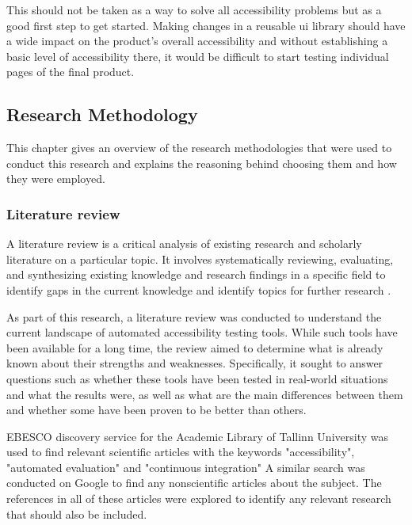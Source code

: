 \documentclass{master_thesis}
\begin{document}
This should not be taken as a way to solve all accessibility problems but as a good first step to get started. Making changes in a reusable \ac{ui} library should have a wide impact on the product's overall accessibility and without establishing a basic level of accessibility there, it would be difficult to start testing individual pages of the final product.

\subsection{Research Methodology}


This chapter gives an overview of the research methodologies that were used to conduct this research and explains the reasoning behind choosing them and how they were employed.

\subsubsection{Literature review}

A literature review is a critical analysis of existing research and scholarly literature on a particular topic. It involves systematically reviewing, evaluating, and synthesizing existing knowledge and research findings in a specific field to identify gaps in the current knowledge and identify topics for further research \citep{Luft2022}.

As part of this research, a literature review was conducted to understand the current landscape of automated accessibility testing tools. While such tools have been available for a long time, the review aimed to determine what is already known about their strengths and weaknesses. Specifically, it sought to answer questions such as whether these tools have been tested in real-world situations and what the results were, as well as what are the main differences between them and whether some have been proven to be better than others.

EBESCO discovery service for the Academic Library of Tallinn University was used to find relevant scientific articles with the keywords "accessibility", "automated evaluation" and "continuous integration" A similar search was conducted on Google to find any nonscientific articles about the subject. The references in all of these articles were explored to identify any relevant research that should also be included.
\end{document}
